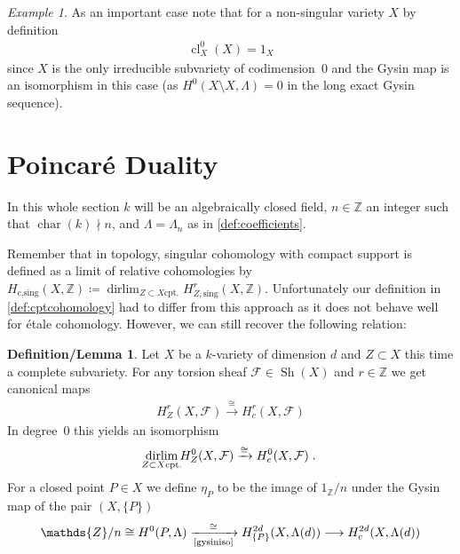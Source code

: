 \documentclass[english]{scrartcl}
\theoremstyle{definition}
\newtheorem{DefLem}[Def]{Definition/Lemma}
\theoremstyle{remark}
\newtheorem{Ex}[Def]{Example}
\newcommand*{\Z}{\mathds{Z}}
\newcommand*{\Zmod}[1]{\Z/#1} %
\newcommand*{\F}{\mathcal{F}} %
\DeclareMathOperator{\Char}{char} %
\DeclareMathOperator*{\dirlim}{dirlim} %
\DeclareMathOperator{\Sh}{Sh} %
\DeclareMathOperator{\CL}{cl} %
\newcommand*{\one}[1]{{1_{#1}}}%
\begin{document}
\begin{Ex}\label{ex:clxx}
  As an important case note that for a non-singular variety $X$
  by definition
  \begin{gather*}
    \CL_{X}^0(X)=\one{X}
  \end{gather*}
  since $X$ is the only irreducible
  subvariety of codimension~$0$ and the Gysin map is an isomorphism in
  this case (as $H^0(X\setminus X,\Lambda)=0$ in the long exact Gysin
  sequence).
\end{Ex}

\section{Poincaré Duality}
In this whole section $k$ will be an algebraically closed field,
$n\in\Z$ an integer such that $\Char(k)\nmid n$,
and $\Lambda=\Lambda_n$ as in \ref{def:coefficients}.

Remember that in topology, singular cohomology with compact support is
defined as a limit of relative cohomologies by
$H_{\text{c,sing}}(X,\Z)\coloneqq
\dirlim_{Z\subset X \text{cpt.}}H_{Z,\text{sing}}^r(X,\Z)$.
Unfortunately our definition in \ref{def:cptcohomology} had to differ from
this approach as it does not behave well for étale cohomology.
However, we can still recover the following relation:
\begin{DefLem}\label{def:etapoint}
  Let $X$ be a $k$-variety of dimension $d$ and $Z\subset X$ this time
  a complete subvariety. For any torsion sheaf $\F\in\Sh(X)$ and
  $r\in\Z$ we get canonical maps
  \begin{gather*}
    H_Z^r(X,\F)\xrightarrow{\cong} H_c^r(X,\F)
  \end{gather*}
  In degree~0 this yields an isomorphism
  \begin{gather*}
    \dirlim_{\mathclap{Z\subset X \text{cpt.}}} H_Z^0(X,\F) 
    \xrightarrow{\cong} H_c^0(X,\F)\;.
  \end{gather*}
  For a closed point $P\in X$ we define $\eta_P$ to be the image of
  $1_\Zmod{n}$ under the Gysin map of the pair $(X,\{P\})$
  \begin{gather*}
    \Zmod{n}
    \cong H^0(P,\Lambda)
    \xrightarrow[\text{\ref{gysiniso}}]{\cong}
    H_{\{P\}}^{2d}(X,\Lambda(d))
    \longrightarrow H_c^{2d}(X,\Lambda(d))
  \end{gather*}
\end{DefLem}
\end{document}

